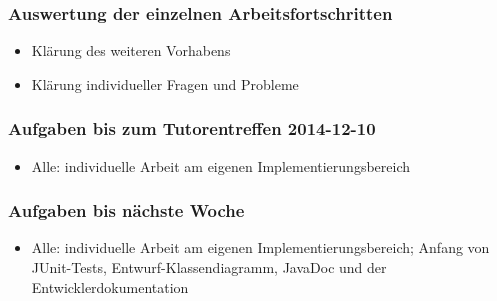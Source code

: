 \documentclass[12pt,a4paper]{article}
\begin{document}
\subsubsection*{Auswertung der einzelnen Arbeitsfortschritten}
\begin{itemize}
\item Klärung des weiteren Vorhabens
\item Klärung individueller Fragen und Probleme
\end{itemize}

\subsubsection*{Aufgaben bis zum Tutorentreffen 2014-12-10}
\begin{itemize}
\item Alle: individuelle Arbeit am eigenen Implementierungsbereich
\end{itemize}

\subsubsection*{Aufgaben bis nächste Woche}
\begin{itemize}
\item Alle: individuelle Arbeit am eigenen Implementierungsbereich; Anfang von JUnit-Tests, Entwurf-Klassendiagramm, JavaDoc und der Entwicklerdokumentation
\end{itemize}
\end{document}

